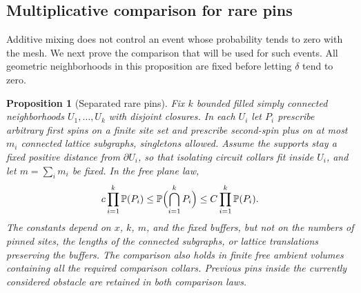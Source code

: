 \documentclass[11pt]{article}
\newtheorem{proposition}[theorem]{Proposition}
\theoremstyle{definition}
\theoremstyle{remark}
\numberwithin{equation}{section}
\begin{document}
\subsection{Multiplicative comparison for rare pins}

Additive mixing does not control an event whose probability tends to zero
with the mesh. We next prove the comparison that will be used for such
events. All geometric neighborhoods in this proposition are fixed before
letting $\delta$ tend to zero.

\begin{proposition}[Separated rare pins]\label{prop:rare-pins}
Fix $k$ bounded filled simply connected neighborhoods $U_1,\ldots,U_k$
with disjoint closures. In each $U_i$ let $P_i$ prescribe arbitrary first
spins on a finite site set and prescribe second-spin plus on at most
$m_i$ connected lattice subgraphs, singletons allowed. Assume the
supports stay a fixed positive distance from $\partial U_i$, so that
isolating circuit collars fit inside $U_i$, and let $m=\sum_i m_i$ be
fixed. In the free plane law,
\begin{equation}\label{discrete:rare-pins}
 c\prod_{i=1}^k\mathbb P(P_i)
 \le \mathbb P\Bigl(\bigcap_{i=1}^kP_i\Bigr)
 \le C\prod_{i=1}^k\mathbb P(P_i).
\end{equation}
The constants depend on $x$, $k$, $m$, and the fixed buffers, but not on
the numbers of pinned sites, the lengths of the connected subgraphs, or
lattice translations preserving the buffers. The comparison also holds
in finite free ambient volumes containing all the required comparison
collars. Previous pins inside the currently considered obstacle are
retained in both comparison laws.
\end{proposition}
\end{document}

